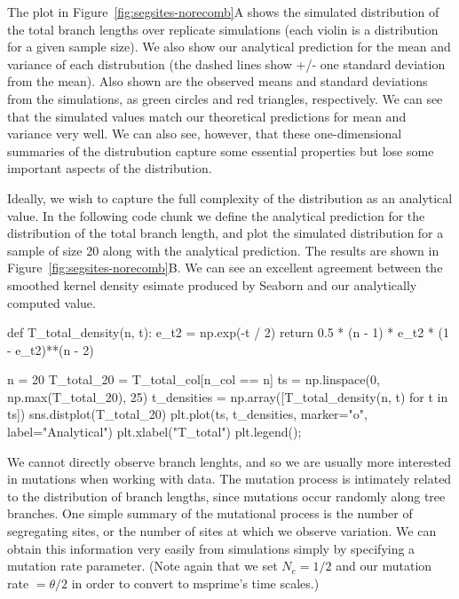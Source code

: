 \documentclass[graybox]{svmult}
\begin{document}
    The plot in Figure~\ref{fig:segsites-norecomb}A shows the simulated
distribution of the total branch lengths
over replicate simulations (each violin is a distribution for a given
sample size). We also show our analytical prediction for the mean and
variance of each distrubution (the dashed lines show +/- one standard
deviation from the mean). Also shown are the observed means and standard
deviations from the simulations, as green circles and red triangles,
respectively. We can see that the simulated values match our theoretical
predictions for mean and variance very well. We can also see, however,
that these one-dimensional summaries of the distrubution capture some
essential properties but lose some important aspects of the
distribution.

    Ideally, we wish to capture the full complexity of the distribution as
an analytical value. In the following code chunk we define the analytical
prediction for the distribution of the total branch length, and
plot the simulated distribution for a sample of size 20 along with
the analytical prediction. The results are shown in
Figure~\ref{fig:segsites-norecomb}B. We can see an excellent agreement between
the smoothed kernel
density esimate produced by Seaborn and our analytically computed value.

\begin{pythoncode}
def T_total_density(n, t):
    e_t2 = np.exp(-t / 2)
    return 0.5 * (n - 1) * e_t2 * (1 - e_t2)**(n - 2)

n = 20
T_total_20 = T_total_col[n_col == n]
ts = np.linspace(0, np.max(T_total_20), 25)
t_densities = np.array([T_total_density(n, t) for t in ts])
sns.distplot(T_total_20)
plt.plot(ts, t_densities, marker="o", label="Analytical")
plt.xlabel("T_total")
plt.legend();
\end{pythoncode}

We cannot directly observe branch lenghts, and so we are usually more
interested in mutations when working with data. The mutation process is
intimately related to the distribution of branch lengths, since
mutations occur randomly along tree branches. One simple summary of the
mutational process is the number of segregating sites, or the number of
sites at which we observe variation. We can obtain this information very
easily from simulations simply by specifying a mutation rate parameter.
(Note again that we set \(N_e=1/2\) and our mutation rate
\(= \theta / 2\) in order to convert to msprime's time scales.)
\end{document}
